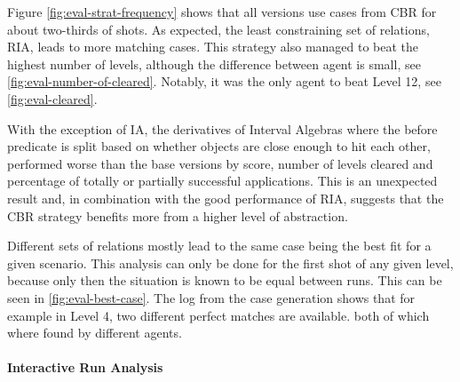 Figure \ref{fig:eval-strat-frequency} shows that all versions use cases from \ac{CBR} for about two-thirds of shots. As expected, the least constraining set of relations, \ac{RIA}, leads to more matching cases. This strategy also managed to beat the highest number of levels, although the difference between agent is small, see \ref{fig:eval-number-of-cleared}. Notably, it was the only agent to beat Level 12, see \ref{fig:eval-cleared}.

With the exception of \ac{IA}, the derivatives of Interval Algebras where the before predicate is split based on whether objects are close enough to hit each other, performed worse than the base versions by score, number of levels cleared and percentage of totally or partially successful applications. This is an unexpected result and, in combination with the good performance of \ac{RIA}, suggests that the \ac{CBR} strategy benefits more from a higher level of abstraction.

Different sets of relations mostly lead to the same case being the best fit for a given scenario. This analysis can only be done for the first shot of any given level, because only then the situation is known to be equal between runs. This can be seen in \ref{fig:eval-best-case}. The log from the case generation shows that for example in Level 4, two different perfect matches are available. both of which where found by different agents.

\paragraph{Interactive Run Analysis}

